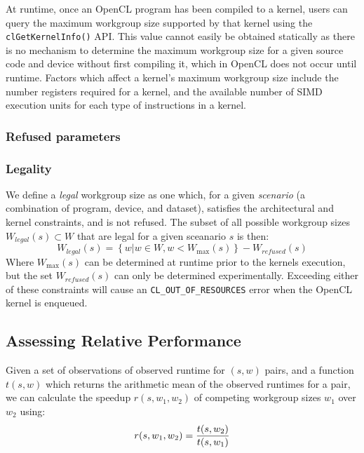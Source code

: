 At runtime, once an OpenCL program has been compiled to a kernel,
users can query the maximum workgroup size supported by that kernel
using the \texttt{clGetKernelInfo()} API. This value cannot easily be
obtained statically as there is no mechanism to determine the maximum
workgroup size for a given source code and device without first
compiling it, which in OpenCL does not occur until runtime. Factors
which affect a kernel's maximum workgroup size include the number
registers required for a kernel, and the available number of SIMD
execution units for each type of instructions in a kernel.


\subsubsection{Refused parameters}

\TODO{\ldots}


\subsubsection{Legality}

We define a \emph{legal} workgroup size as one which, for a given
\emph{scenario} (a combination of program, device, and dataset),
satisfies the architectural and kernel constraints, and is not
refused. The subset of all possible workgroup sizes
$W_{legal}(s) \subset W$ that are legal for a given sceanario $s$ is
then:
%
\begin{equation}
  W_{legal}(s) = \left\{w | w \in W, w < W_{\max}(s) \right\} - W_{refused}(s)
\end{equation}
%
Where $W_{\max}(s)$ can be determined at runtime prior to the kernels
execution, but the set $W_{refused}(s)$ can only be determined
experimentally. Exceeding either of these constraints will cause an
\texttt{CL\_OUT\_OF\_RESOURCES} error when the OpenCL kernel is
enqueued.


\subsection{Assessing Relative Performance}

Given a set of observations of observed runtime for $(s,w)$ pairs, and
a function $t(s,w)$ which returns the arithmetic mean of the observed
runtimes for a pair, we can calculate the speedup $r(s, w_1, w_2)$ of
competing workgroup sizes $w_1$ over $w_2$ using:
%
\begin{equation}
  r(s, w_1, w_2) = \frac{t(s,w_2)}{t(s,w_1)}\\
\end{equation}
%

